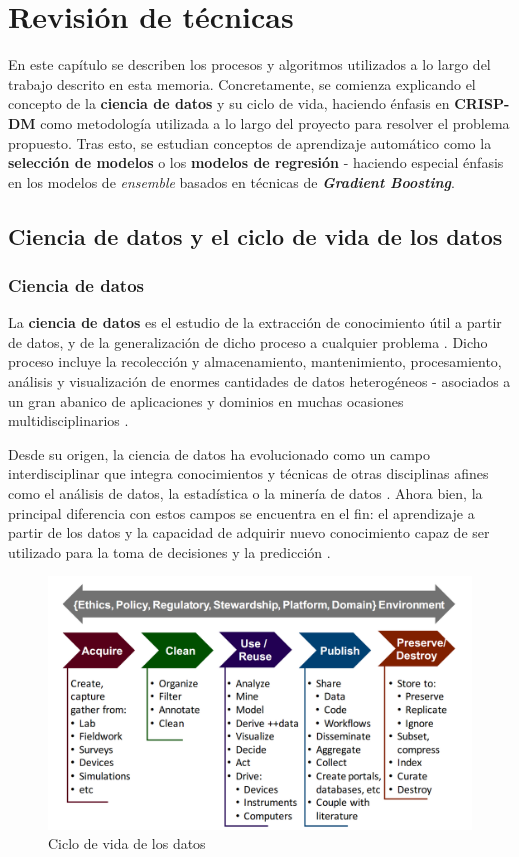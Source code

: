 \chapter{Revisión de técnicas}

En este capítulo se describen los procesos y algoritmos utilizados a lo largo del trabajo descrito en esta memoria. Concretamente, se comienza explicando el concepto de la \textbf{ciencia de datos} y su ciclo de vida, haciendo énfasis en \textbf{CRISP-DM} como metodología utilizada a lo largo del proyecto para resolver el problema propuesto. Tras esto, se estudian conceptos de aprendizaje automático como la \textbf{selección de modelos} o los \textbf{modelos de regresión} - haciendo especial énfasis en los modelos de \textit{ensemble} basados en técnicas de \textbf{\textit{Gradient Boosting}}.

\section{Ciencia de datos y el ciclo de vida de los datos}

\subsection{Ciencia de datos}

La \textbf{ciencia de datos} es el estudio de la extracción de conocimiento útil a partir de datos, y de la generalización de dicho proceso a cualquier problema \cite{Donoho02102017}. Dicho proceso incluye la recolección y almacenamiento, mantenimiento, procesamiento, análisis y visualización de enormes cantidades de datos heterogéneos - asociados a un gran abanico de aplicaciones y dominios en muchas ocasiones multidisciplinarios \cite{10.1145/2500499}.

Desde su origen, la ciencia de datos ha evolucionado como un campo interdisciplinar que integra conocimientos y técnicas de otras disciplinas afines como el análisis de datos, la estadística o la minería de datos \cite{potential}. Ahora bien, la principal diferencia con estos campos se encuentra en el fin: el aprendizaje a partir de los datos \cite{Donoho02102017} y la capacidad de adquirir nuevo conocimiento capaz de ser utilizado para la toma de decisiones y la predicción \cite{10.1145/2500499}.

\begin{figure}[h]
	\vspace{-2mm}
	\centering
	\includegraphics[width=0.6\linewidth]{figs/chapter2/datalifecycle}
	\caption{Ciclo de vida de los datos \cite{potential}}
	\captionsetup{belowskip=-100pt}
	\label{fig:datalifecycle}
\end{figure}

